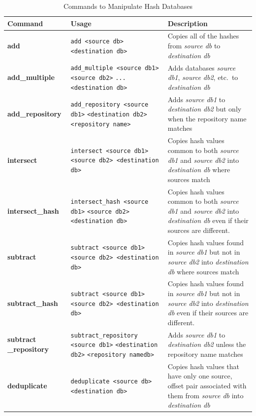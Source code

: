 \documentclass[11pt,fleqn]{article} %
\begin{document}
\begin{table}[!ht]
\centering
\caption{Commands to Manipulate Hash Databases}
\label{tab:databaseManipulation}
\begin{tabular}{|p{3.5 cm}|p{6 cm}|p{4 cm}|}
\hline \hline
\textbf{Command} & \textbf{Usage} & \textbf{Description} \\
\hline
\textbf{add} & \verb+add <source db>+ \verb+<destination db>+ & Copies all of the hashes from \textit{source db} to \textit{destination db}\\
\hline
\textbf{add\_multiple} &  \verb+add_multiple <source db1>+ \verb+<source db2>+ \verb+...+ \verb+<destination db>+ & Adds databases \textit{source db1}, \textit{source db2}, etc.\ to \textit{destination db}\\
\hline
\textbf{add\_repository} & \verb+add_repository <source db1>+ \verb+<destination db2>+ \verb+<repository name>+ & Adds \textit{source db1} to \textit{destination db2} but only when the repository name matches\\
\hline
\textbf{intersect} & \verb+intersect <source db1>+ \verb+<source db2> <destination db>+ &   Copies hash values common to both \textit{source db1} and \textit{source db2} into \textit{destination db} where sources match\\
\hline
\textbf{intersect\_hash} & \verb+intersect_hash <source db1>+ \verb+<source db2> <destination db>+ &   Copies hash values common to both \textit{source db1} and \textit{source db2} into \textit{destination db} even if their sources are different.\\
\hline
\textbf{subtract} & \verb+subtract <source db1>+ \verb+<source db2> <destination db>+&   Copies hash values found in \textit{source db1} but not in \textit{source db2} into \textit{destination db} where sources match\\
\hline
\textbf{subtract\_hash} & \verb+subtract <source db1>+ \verb+<source db2> <destination db>+&   Copies hash values found in \textit{source db1} but not in \textit{source db2} into \textit{destination db} even if their sources are different.\\
\hline
\textbf{subtract \_repository} & \verb+subtract_repository+ \verb+<source db1>+ \verb+<destination db2>+ \verb+<repository namedb>+ & Adds \textit{source db1} to \textit{destination db2} unless the repository name matches\\
\hline
\textbf{deduplicate} & \verb+deduplicate <source db>+ \verb+<destination db>+ &   Copies hash values that have only one source, offset pair associated with them from \textit{source db} into \textit{destination db}\\
\hline
\end{tabular}
\end{table}
\end{document}
